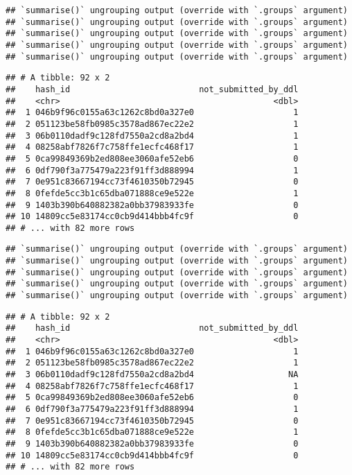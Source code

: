 \documentclass[
]{article}
\begin{document}
\begin{verbatim}
## `summarise()` ungrouping output (override with `.groups` argument)
## `summarise()` ungrouping output (override with `.groups` argument)
## `summarise()` ungrouping output (override with `.groups` argument)
## `summarise()` ungrouping output (override with `.groups` argument)
## `summarise()` ungrouping output (override with `.groups` argument)
\end{verbatim}

\begin{verbatim}
## # A tibble: 92 x 2
##    hash_id                          not_submitted_by_ddl
##    <chr>                                           <dbl>
##  1 046b9f96c0155a63c1262c8bd0a327e0                    1
##  2 051123be58fb0985c3578ad867ec22e2                    1
##  3 06b0110dadf9c128fd7550a2cd8a2bd4                    1
##  4 08258abf7826f7c758ffe1ecfc468f17                    1
##  5 0ca99849369b2ed808ee3060afe52eb6                    0
##  6 0df790f3a775479a223f91ff3d888994                    1
##  7 0e951c83667194cc73f4610350b72945                    0
##  8 0fefde5cc3b1c65dba071888ce9e522e                    1
##  9 1403b390b640882382a0bb37983933fe                    0
## 10 14809cc5e83174cc0cb9d414bbb4fc9f                    0
## # ... with 82 more rows
\end{verbatim}

\begin{verbatim}
## `summarise()` ungrouping output (override with `.groups` argument)
## `summarise()` ungrouping output (override with `.groups` argument)
## `summarise()` ungrouping output (override with `.groups` argument)
## `summarise()` ungrouping output (override with `.groups` argument)
## `summarise()` ungrouping output (override with `.groups` argument)
\end{verbatim}

\begin{verbatim}
## # A tibble: 92 x 2
##    hash_id                          not_submitted_by_ddl
##    <chr>                                           <dbl>
##  1 046b9f96c0155a63c1262c8bd0a327e0                    1
##  2 051123be58fb0985c3578ad867ec22e2                    1
##  3 06b0110dadf9c128fd7550a2cd8a2bd4                   NA
##  4 08258abf7826f7c758ffe1ecfc468f17                    1
##  5 0ca99849369b2ed808ee3060afe52eb6                    0
##  6 0df790f3a775479a223f91ff3d888994                    1
##  7 0e951c83667194cc73f4610350b72945                    0
##  8 0fefde5cc3b1c65dba071888ce9e522e                    1
##  9 1403b390b640882382a0bb37983933fe                    0
## 10 14809cc5e83174cc0cb9d414bbb4fc9f                    0
## # ... with 82 more rows
\end{verbatim}
\end{document}
